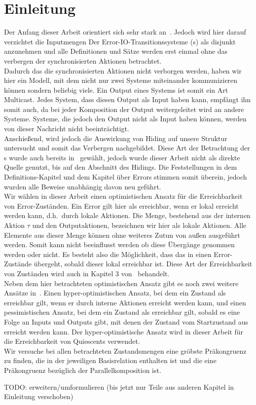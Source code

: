 \chapter{Einleitung}

Der Anfang dieser Arbeit orientiert sich sehr stark an~\cite{Vogler2014EIO}.
Jedoch wird hier darauf verzichtet die Inputmengen Der
Error-IO-Transitionssysteme (\EIO{}s) als disjunkt anzunehmen und alle
Definitionen und Sätze werden erst einmal ohne das verbergen der
synchronisierten Aktionen betrachtet.\\
Dadurch das die synchronisierten Aktionen nicht verborgen werden, haben wir hier
ein Modell, mit dem nicht nur zwei Systeme miteinander kommunizieren können
sondern beliebig viele. Ein Output eines Systems ist somit ein Art Multicast.
Jedes System, dass diesen Output als Input haben kann, empfängt ihn somit auch,
da bei jeder Komposition der Output weitergeleitet wird an andere Systeme.
Systeme, die jedoch den Output nicht als Input haben können, werden von dieser
Nachricht nicht beeinträchtigt.\\
Anschießend, wird jedoch die Auswirkung von Hiding auf unsere Struktur
untersucht und somit das Verbergen nachgebildet. Diese Art der Betrachtung der
\EIO{}s wurde auch bereits in~\cite{Schlosser2012BA} gewählt, jedoch wurde
dieser Arbeit nicht als direkte Quelle genutzt, bis auf den Abschnitt des
Hidings. Die Feststellungen in dem Definitions-Kapitel und dem Kapitel über
Errors stimmen somit überein, jedoch wurden alle Beweise unabhängig davon neu
geführt.\\
Wir wählen in dieser Arbeit einen optimistischen Ansatz für die
Erreichbarkeit von Error-Zuständen. Ein Error gilt hier als erreichbar, wenn er
lokal erreicht werden kann, d.h.\ durch lokale Aktionen. Die Menge, bestehend
aus der internen Aktion $\tau$ und den Outputaktionen, bezeichnen wir hier als
lokale Aktionen. Alle Elemente aus dieser Menge können ohne weiteres Zutun von
außen ausgeführt werden. Somit kann nicht beeinflusst werden ob diese Übergänge
genommen werden oder nicht. Es besteht also die Möglichkeit, dass das
\EIO{} in einen Error-Zustände übergeht, sobald dieser lokal erreichbar ist.
Diese Art der Erreichbarkeit von Zuständen wird auch in Kapitel 3
von~\cite{Vogler2014EIO} behandelt.\\
Neben dem hier betrachteten optimistischen Ansatz gibt es noch zwei weitere
Ansätze in~\cite{Vogler2014EIO}. Einen hyper-optimistischen Ansatz, bei dem ein
Zustand als erreichbar gilt, wenn er durch interne Aktionen erreicht werden
kann, und einen pessimistischen Ansatz, bei dem ein Zustand als erreichbar gilt,
sobald es eine Folge an Inputs und Outputs gibt, mit denen der Zustand vom
Startzustand aus erreicht werden kann. Der hyper-optimistische Ansatz wird in
dieser Arbeit für die Erreichbarkeit von Quiescents verwendet.\\
Wir versuche bei allen betrachteten Zustandsmengen eine gröbste Präkongruenz zu
finden, die in der jeweiligen Basisrelation enthalten ist und die eine
Präkongruenz bezüglich der Parallelkomposition ist.

\scriptsize\textcolor{lgray}{TODO: erweitern/umformulieren (bis jetzt nur Teile aus anderen
Kapitel in Einleitung verschoben)}

\normalsize

